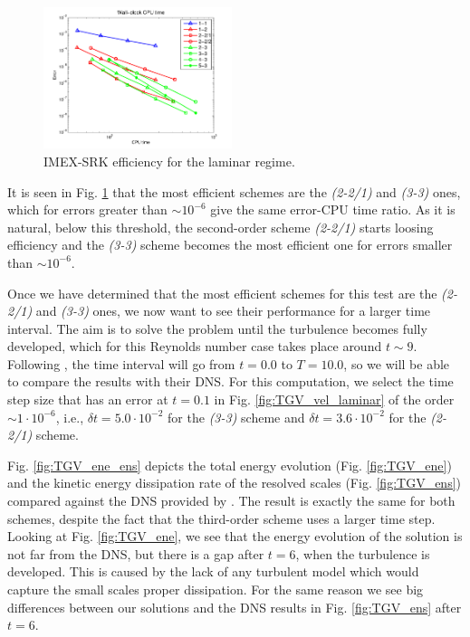 \begin{figure}[h!]
  \centering
  \includegraphics[width=0.49\textwidth]{Figures/Chapter6/TGV/imex_nsi_explcnv_64_T0_Re1600_dt6dot25e-3_effi}
  \caption{IMEX-SRK efficiency for the laminar regime.}
  \label{fig:TGV_effi_laminar}
\end{figure}
It is seen in Fig. \ref{fig:TGV_effi_laminar} that the most efficient schemes are the \textit{(2-2/1)} and  \textit{(3-3)} ones, which for errors greater than $\sim10^{-6}$ give the same error-CPU time ratio. As it is natural, below this threshold, the second-order scheme \textit{(2-2/1)} starts loosing efficiency and the \textit{(3-3)} scheme becomes the most efficient one for errors smaller than $\sim10^{-6}$.

Once we have determined that the most efficient schemes for this test are the \textit{(2-2/1)} and \textit{(3-3)} ones, we now want to see their performance for a larger time interval. The aim is to solve the problem until the turbulence becomes fully developed, which for this Reynolds number case takes place around $t\sim9$. Following \cite{brachet_direct_1991}, the time interval will go from $t=0.0$ to $T=10.0$, so we will be able to compare the results with their DNS. For this computation, we select the time step size that has an error at $t=0.1$ in Fig. \ref{fig:TGV_vel_laminar} of the order $\sim1\cdot10^{-6}$, i.e., $\delta t=5.0\cdot10^{-2}$ for the \textit{(3-3)} scheme and $\delta t=3.6\cdot10^{-2}$ for the \textit{(2-2/1)} scheme.

Fig. \ref{fig:TGV_ene_ens} depicts the total energy evolution (Fig. \ref{fig:TGV_ene}) and the kinetic energy dissipation rate of the resolved scales (Fig. \ref{fig:TGV_ens}) compared against the DNS provided by \cite{brachet_direct_1991}. The result is exactly the same for both schemes, despite the fact that the third-order scheme uses a larger time step. Looking at Fig. \ref{fig:TGV_ene}, we see that the energy evolution of the solution is not far from the DNS, but there is a gap after $t=6$, when the turbulence is developed. This is caused by the lack of any turbulent model which would capture the small scales proper dissipation. For the same reason we see big differences between our solutions and the DNS results in Fig. \ref{fig:TGV_ens} after $t=6$.

